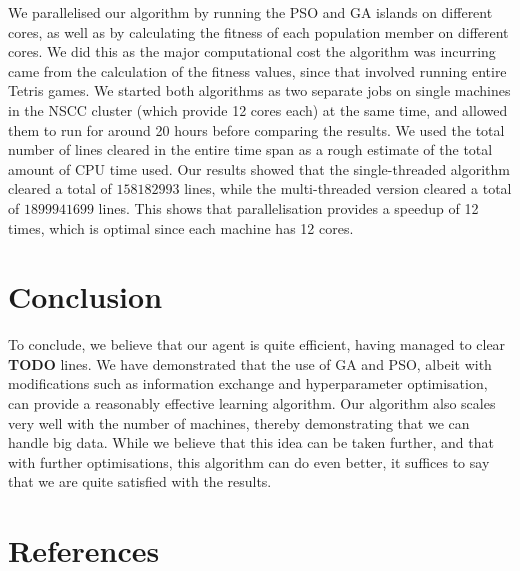\documentclass[12pt]{article}
\begin{document}
	We parallelised our algorithm by running the PSO and GA islands on different cores,
	as well as by calculating the fitness of each population member on different cores.
	We did this as the major computational cost the algorithm was incurring came from
	the calculation of the fitness values, since that involved running entire Tetris games. We started both algorithms as two separate jobs on single machines
	in the NSCC cluster (which provide 12 cores each) at the same time, and allowed them to run for around 20
	hours before comparing the results. We used the total number of lines cleared
	in the entire time span as a rough estimate of the total amount of
	CPU time used. Our results showed that the single-threaded algorithm cleared
	a total of $158182993$ lines, while the multi-threaded version cleared a total
	of $1899941699$ lines. This shows that parallelisation provides a speedup of 12 times,
	which is optimal since each machine has 12 cores.

	\vspace{-0.3cm}
    \section{Conclusion}
	To conclude, we believe that our agent is quite efficient, having managed to clear \textbf{TODO} lines.
	We have demonstrated that the use of GA and PSO, albeit with modifications such as
	information exchange and hyperparameter optimisation, can provide
	a reasonably effective learning algorithm. Our algorithm also scales very well with the number
	of machines, thereby demonstrating that we can handle big data. While we believe that this
	idea can be taken further, and that with further optimisations, this algorithm can do even better,
	it suffices to say that we are quite satisfied with the results.


	\vspace{-0.3cm}
    \section{References}
	
	
\end{document}
